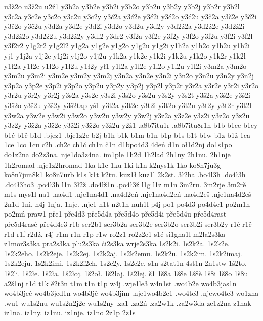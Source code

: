 {u3ž2o
u3ž2u
u2ž1
y3b2a
y3b2e
y3b2i
y3b2o
y3b2u
y3b2y
y3b2j
y3b2r
y3b2l
y3c2a
y3c2e
y3c2o
y3c2u
y3c2y
y3ć2a
y3ć2e
y3ć2i
y3ć2o
y3ć2u
y3č2a
y3č2e
y3č2i
y3č2o
y3č2u
y3d2a
y3d2e
y3d2i
y3d2o
y3d2u
y3d2y
y3d2ź2a
y3d2ź2e
y3d2ź2i
y3d2ź2o
y3d2ź2u
y3d2ź2y
y3dl2
y3dr2
y3f2a
y3f2e
y3f2y
y3f2o
y3f2u
y3f2i
y3f2l
y3f2r2
y1g2r2
y1g2l2
y1g2a
y1g2e
y1g2o
y1g2u
y1g2i
y1h2a
y1h2o
y1h2u
y1h2i
yj1
y1j2a
y1j2e
y1j2i
y1j2o
y1j2u
y1k2a
y1k2e
y1k2i
y1k2u
y1k2o
y1k2r
y1k2l
y1ł2a
y1ł2e
y1ł2o
y1ł2u
y1ł2y
ył1
y1l2a
y1l2e
y1l2o
y1l2u
y1l2i
y3m2a
y3m2o
y3m2u
y3m2i
y3m2e
y3m2y
y3m2j
y3n2a
y3n2e
y3n2i
y3n2o
y3n2u
y3n2y
y3n2j
y3p2a
y3p2e
y3p2i
y3p2o
y3p2u
y3p2y
y3p2j
y3p2l
y3p2r
y3r2a
y3r2e
y3r2i
y3r2o
y3r2u
y3r2y
y3r2j
y3s2a
y3s2e
y3s2i
y3s2o
y3s2u
y3s2y
y3s2t
y3š2a
y3š2e
y3š2i
y3š2o
y3š2u
y3š2y
y3š2tap
yš1
y3t2a
y3t2e
y3t2i
y3t2o
y3t2u
y3t2y
y3t2r
y3t2l
y3w2a
y3w2e
y3w2i
y3w2o
y3w2u
y3w2y
y3w2j
y3z2a
y3z2e
y3z2i
y3z2o
y3z2u
y3z2y
y3ž2a
y3ž2e
y3ž2i
y3ž2o
y3ž2u
y2ž1
.a8b7itu1r
.a8b7itu8r1n
b1b
b1ce
b1cy
b1ć
b1č
b1d
.bjez1
.bje1z2e
b2j
b1h
b1k
b1m
b1n
b1p
b1s
b1t
b1w
b1z
b1ž
1ca
1ce
1co
1cu
c2h
.ch2c
ch1ć
ch1n
č1n
d1bpo4d3
4deń
d1n
oł1d2nj
do1s1po
do1z2na
do2z3na.
nje1do3z4na.
im1ple
1h2d
1h2lad
2h1ny
2h1nu.
2h1nje
1h2romad
.nje1z2hromad
1ka
k1c
1ku
1ki
k1n
k2nys1k
1ko
ko8n7ju3g
ko8n7jun8k1
ko8n7urb
k1s
k1t
k2tu.
kuz1ł
kuz1l
2k2st.
3ł2ha
.bo4ł3h
.do4ł3h
.do4ł3ho3
.po4ł3h
l1n
3ł2ž
.do4łž1n
.po4ł3ž
l1g
l1z
m1n
3m2ru.
3m2rje
3m2rě
m1s
mys1l
na1
.na4d1
.nje1na4d1
.na4d2eń
.nje1na4d2eń
.na4d2eš
.nje1na4d2eš
2n1d
1ni.
n4j
1nja.
1nje.
.nje1
n1t
n2t1n
nuh1l
p4j
po1
po4d3
po4d4e1
po2m1h
po2mń
praw1
pře1
pře4d3
pře5d4a
pře5d4o
pře5d4i
pře5d4u
pře5d4rast
pře5d4rasć
pře4d4e3
r1b
ser2b1
ser3b2a
ser3b2e
ser3b2o
ser3b2i
ser3b2y
r1ć
r1č
r1d
r1f
r2dź.
r4j
r1m
r1n
r1p
r1w
ro2z1
ro2z2e1
s1ć
si1gna1l
m2la2s3ka
z1mor3s3ka
pra2s3ka
plu2s3ka
ći2s3ka
wrje2s3ka
1s2k2i.
1s2k2a.
1s2k2e.
1s2k2eho.
1s2k2eje.
1s2k2ej.
1s2k2aj.
1s2k2emu.
1s2k2u.
1s2k2im.
1s2k2imaj.
1s2k2eju.
1s2k2imi.
1s2k2i2ch.
1s2c2y.
1s2c2e.
s1n
s2tat1n
4st1n
2n1stw
1š2to.
1š2li.
1š2łe.
1š2ła.
1š2łoj.
1š2oł.
1š2łaj.
1š2łej.
š1
1š8a
1š8e
1š8ě
1š8i
1š8o
1š8u
a2š1nj
t1d
t1k
ě2t3n
t1m
t1n
t1p
w4j
.wje1le3
w4n1st
.wo4b2e
wo4b3jas1n
wo4b3jeć
wo4b3jed1n
wo4b3jě
wo4b3jim
.nje1wo4b2e1
.wo4te3
.njewo4te3
wo1zna
.wu1
wu1s2nu
wu1s2n2j2e
wu1s2ny
.za1
.za2ń
.za2w1k
.za2w3da
ze1z2na
z1nak
iz1na.
iz1ny.
iz1nu.
iz1nje.
iz1no
2z1p
2z1s
}


